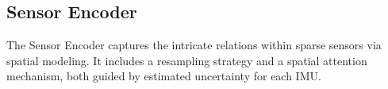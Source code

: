 \documentclass[letterpaper]{article} %
\begin{document}
\subsection{Sensor Encoder} 

The Sensor Encoder captures the intricate relations within sparse sensors via spatial modeling. It includes a resampling strategy and a spatial attention mechanism, both guided by estimated uncertainty for each IMU.   
\end{document}
